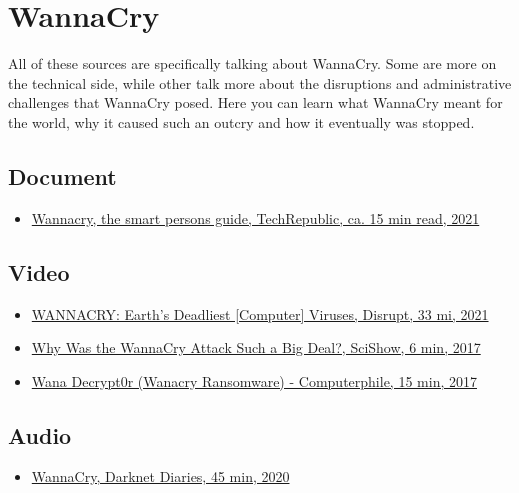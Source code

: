 \chapter{WannaCry}

All of these sources are specifically talking about WannaCry.
Some are more on the technical side, while other talk more about the disruptions and administrative challenges that WannaCry posed.
Here you can learn what WannaCry meant for the world, why it caused such an outcry and how it eventually was stopped.

\section{Document}

\begin{itemize}
    \item \href{https://www.techrepublic.com/article/ransomware-cheat-sheet-everything-you-need-to-know/}{Wannacry, the smart persons guide, TechRepublic, ca. 15 min read, 2021}
\end{itemize}

\section{Video}

\begin{itemize}
    \item \href{https://youtu.be/I5Wxh-rCzrY}{WANNACRY: Earth's Deadliest [Computer] Viruses, Disrupt, 33 mi, 2021}
    \item \href{https://www.youtube.com/watch?v=etPizFNPupk}{Why Was the WannaCry Attack Such a Big Deal?, SciShow, 6 min, 2017}
    \item \href{https://youtu.be/88jkB1V6N9w}{Wana Decrypt0r (Wanacry Ransomware) - Computerphile, 15 min, 2017}
\end{itemize}

\section{Audio}

\begin{itemize}
    \item \href{https://darknetdiaries.com/episode/73/}{WannaCry, Darknet Diaries, 45 min, 2020} 
\end{itemize}